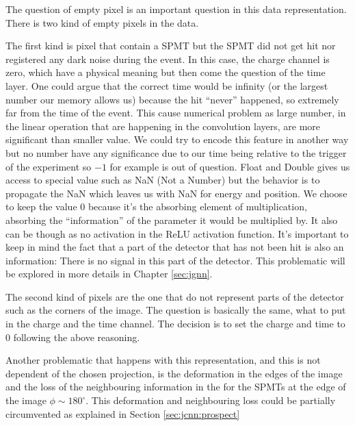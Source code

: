\documentclass[../main.tex]{subfiles}
\begin{document}
\hfill

The question of empty pixel is an important question in this data representation. There is two kind of empty pixels in the data.

The first kind is pixel that contain a SPMT but the SPMT did not get hit nor registered any dark noise during the event. In this case, the charge channel is zero, which have a physical meaning but then come the question of the time layer. One could argue that the correct time would be infinity (or the largest number our memory allows us) because the hit ``never'' happened, so extremely far from the time of the event. This cause numerical problem as large number, in the linear operation that are happening in the convolution layers, are more significant than smaller value. We could try to encode this feature in another way but no number have any significance due to our time being relative to the trigger of the experiment so $-1$ for example is out of question. Float and Double gives us access to special value such as NaN (Not a Number) \cite{noauthor_ieee_2019} but the behavior is to propagate the NaN which leaves us with NaN for energy and position. We choose to keep the value 0 because it's the absorbing element of multiplication, absorbing the ``information'' of the parameter it would be multiplied by. It also can be though as no activation in the ReLU activation function. It's important to keep in mind the fact that a part of the detector that has not been hit is also an information: There is no signal in this part of the detector. This problematic will be explored in more details in Chapter \ref{sec:jgnn}.

The second kind of pixels are the one that do not represent parts of the detector such as the corners of the image. The question is basically the same, what to put in the charge and the time channel. The decision is to set the charge and time to 0 following the above reasoning.

Another problematic that happens with this representation, and this is not dependent of the chosen projection, is the deformation in the edges of the image and the loss of the neighbouring information in the for the SPMTs at the edge of the image $\phi \sim 180^\circ$. This deformation and neighbouring loss could be partially circumvented as explained in Section \ref{sec:jcnn:prospect}
\end{document}
